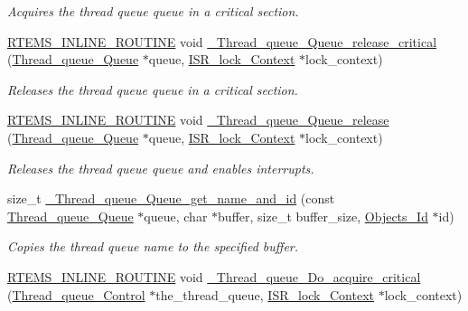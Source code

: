\begin{DoxyCompactItemize}
\begin{DoxyCompactList}\small\item\em Acquires the thread queue queue in a critical section. \end{DoxyCompactList}\item 
\mbox{\hyperlink{group__RTEMSScoreBaseDefs_gac216239df231d5dbd15e3520b0b9313f}{R\+T\+E\+M\+S\+\_\+\+I\+N\+L\+I\+N\+E\+\_\+\+R\+O\+U\+T\+I\+NE}} void \mbox{\hyperlink{group__RTEMSScoreThreadQueue_gaf210496afecfdf44064e41e8a83950ea}{\+\_\+\+Thread\+\_\+queue\+\_\+\+Queue\+\_\+release\+\_\+critical}} (\mbox{\hyperlink{structThread__queue__Queue}{Thread\+\_\+queue\+\_\+\+Queue}} $\ast$queue, \mbox{\hyperlink{structISR__lock__Context}{I\+S\+R\+\_\+lock\+\_\+\+Context}} $\ast$lock\+\_\+context)
\begin{DoxyCompactList}\small\item\em Releases the thread queue queue in a critical section. \end{DoxyCompactList}\item 
\mbox{\hyperlink{group__RTEMSScoreBaseDefs_gac216239df231d5dbd15e3520b0b9313f}{R\+T\+E\+M\+S\+\_\+\+I\+N\+L\+I\+N\+E\+\_\+\+R\+O\+U\+T\+I\+NE}} void \mbox{\hyperlink{group__RTEMSScoreThreadQueue_ga5074d780cc6e486c858a564e0406f647}{\+\_\+\+Thread\+\_\+queue\+\_\+\+Queue\+\_\+release}} (\mbox{\hyperlink{structThread__queue__Queue}{Thread\+\_\+queue\+\_\+\+Queue}} $\ast$queue, \mbox{\hyperlink{structISR__lock__Context}{I\+S\+R\+\_\+lock\+\_\+\+Context}} $\ast$lock\+\_\+context)
\begin{DoxyCompactList}\small\item\em Releases the thread queue queue and enables interrupts. \end{DoxyCompactList}\item 
size\+\_\+t \mbox{\hyperlink{group__RTEMSScoreThreadQueue_gac17ae1a1c80b80869cac13c6c8bb9ade}{\+\_\+\+Thread\+\_\+queue\+\_\+\+Queue\+\_\+get\+\_\+name\+\_\+and\+\_\+id}} (const \mbox{\hyperlink{structThread__queue__Queue}{Thread\+\_\+queue\+\_\+\+Queue}} $\ast$queue, char $\ast$buffer, size\+\_\+t buffer\+\_\+size, \mbox{\hyperlink{group__RTEMSScoreObject_ga5821f52a51072941bdd603e542d0863e}{Objects\+\_\+\+Id}} $\ast$id)
\begin{DoxyCompactList}\small\item\em Copies the thread queue name to the specified buffer. \end{DoxyCompactList}\item 
\mbox{\hyperlink{group__RTEMSScoreBaseDefs_gac216239df231d5dbd15e3520b0b9313f}{R\+T\+E\+M\+S\+\_\+\+I\+N\+L\+I\+N\+E\+\_\+\+R\+O\+U\+T\+I\+NE}} void \mbox{\hyperlink{group__RTEMSScoreThreadQueue_gaf1488e09cc925566233f2f1fc76c4d81}{\+\_\+\+Thread\+\_\+queue\+\_\+\+Do\+\_\+acquire\+\_\+critical}} (\mbox{\hyperlink{structThread__queue__Control}{Thread\+\_\+queue\+\_\+\+Control}} $\ast$the\+\_\+thread\+\_\+queue, \mbox{\hyperlink{structISR__lock__Context}{I\+S\+R\+\_\+lock\+\_\+\+Context}} $\ast$lock\+\_\+context)

\end{DoxyCompactItemize}
